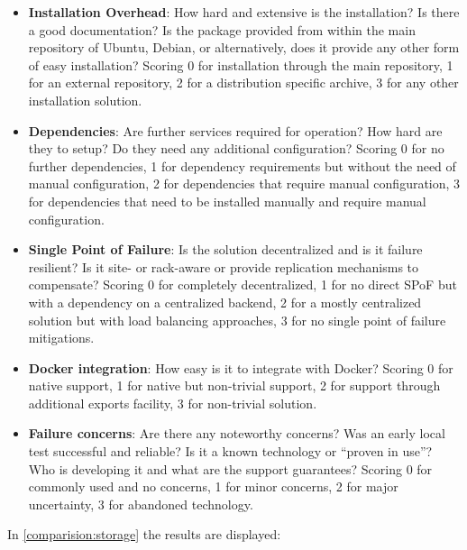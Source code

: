 \begin{itemize}
\item \textbf{Installation Overhead}:
How hard and extensive is the installation?
Is there a good documentation?
Is the package provided from within the main repository of Ubuntu, Debian, or alternatively, does it provide any other form of easy installation?
Scoring 0 for installation through the main repository, 1 for an external repository, 2 for a distribution specific archive, 3 for any other installation solution.

\item \textbf{Dependencies}:
Are further services required for operation? 
How hard are they to setup?
Do they need any additional configuration?
Scoring 0 for no further dependencies, 1 for dependency requirements but without the need of manual configuration,  2 for dependencies that require manual configuration, 3 for dependencies that need to be installed manually and require manual configuration.

\item \textbf{Single Point of Failure}:
Is the solution decentralized and is it failure resilient?
Is it site- or rack-aware or provide replication mechanisms to compensate?
Scoring 0 for completely decentralized, 1 for no direct SPoF but with a dependency on a centralized backend, 2 for a mostly centralized solution but with load balancing approaches, 3 for no single point of failure mitigations.

\item \textbf{Docker integration}:
How easy is it to integrate with Docker?
Scoring 0 for native support, 1 for native but non-trivial support, 2 for support through additional exports facility, 3 for non-trivial solution.

\item \textbf{Failure concerns}:
Are there any noteworthy concerns?
Was an early local test successful and reliable?
Is it a known technology or \enquote{proven in use}?
Who is developing it and what are the support guarantees?
Scoring 0 for commonly used and no concerns, 1 for minor concerns, 2 for major uncertainty, 3 for abandoned technology.
\end{itemize}

In \autoref{comparision:storage} the results are displayed:

